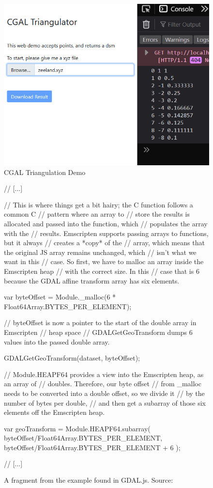 \begin{figure}
  \graphicspath{{../../assets/images/6.1.4/}}
  \centering
  \includegraphics[width=0.50\linewidth]{demo-3.PNG}
  \caption[loading a plugin]{CGAL Triangulation Demo}
  \label{fig:cgal-tryout-3}
\end{figure}

\begin{figure}
  \graphicspath{{../../assets/images/6.1.2/}}
  \centering
  \begin{code}
  // [...]
  
  // This is where things get a bit hairy; the C function follows a common C
  // pattern where an array to
  // store the results is allocated and passed into the function, which 
  // populates the array with the
  // results. Emscripten supports passing arrays to functions, but it always 
  // creates a *copy* of the
  // array, which means that the original JS array remains unchanged, which 
  // isn't what we want in this
  // case. So first, we have to malloc an array inside the Emscripten heap  
  // with the correct size. In this
  // case that is 6 because the GDAL affine transform array has six elements.

  var byteOffset = Module._malloc(6 * Float64Array.BYTES_PER_ELEMENT);
  
  // byteOffset is now a pointer to the start of the double array in Emscripten 
  // heap space
  // GDALGetGeoTransform dumps 6 values into the passed double array.
  
  GDALGetGeoTransform(dataset, byteOffset);
  
  // Module.HEAPF64 provides a view into the Emscripten heap, as an array of 
  // doubles. Therefore, our byte offset
  // from _malloc needs to be converted into a double offset, so we divide it 
  // by the number of bytes per double,
  // and then get a subarray of those six elements off the Emscripten heap.
  
  var geoTransform = Module.HEAPF64.subarray(
      byteOffset/Float64Array.BYTES_PER_ELEMENT,
      byteOffset/Float64Array.BYTES_PER_ELEMENT + 6
  );
  
  // [...]
  \end{code}
  
  \caption[]{A fragment from the  example found in GDAL.js. Source: \citet{dohler_gdal_2022}}
  \label{fig:gdaljs_ugly}
\end{figure}

